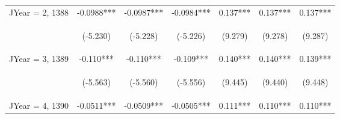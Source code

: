 \documentclass[]{standalone}
\begin{document}
\begin{tabular}{lcccccc}
    JYear = 2, 1388  & -0.0988***                                     & -0.0987***                                     & -0.0984***                                     & 0.137***                                       & 0.137***                                       & 0.137***                                       \\
    \vspace{4pt}     & \begin{footnotesize}(-5.230)\end{footnotesize} & \begin{footnotesize}(-5.228)\end{footnotesize} & \begin{footnotesize}(-5.226)\end{footnotesize} & \begin{footnotesize}(9.279)\end{footnotesize}  & \begin{footnotesize}(9.278)\end{footnotesize}  & \begin{footnotesize}(9.287)\end{footnotesize}  \\
    JYear = 3, 1389  & -0.110***                                      & -0.110***                                      & -0.109***                                      & 0.140***                                       & 0.140***                                       & 0.139***                                       \\
    \vspace{4pt}     & \begin{footnotesize}(-5.563)\end{footnotesize} & \begin{footnotesize}(-5.560)\end{footnotesize} & \begin{footnotesize}(-5.556)\end{footnotesize} & \begin{footnotesize}(9.445)\end{footnotesize}  & \begin{footnotesize}(9.440)\end{footnotesize}  & \begin{footnotesize}(9.448)\end{footnotesize}  \\
    JYear = 4, 1390  & -0.0511***                                     & -0.0509***                                     & -0.0505***                                     & 0.111***                                       & 0.110***                                       & 0.110***                                       \\

\end{tabular}
\end{document}
